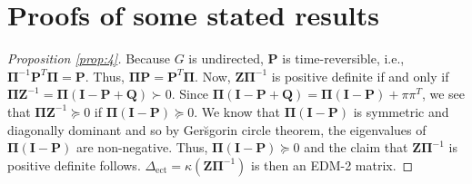 \documentclass[10pt,twocolumn]{article}
\numberwithin{equation}{section}
\begin{document}
\section{Proofs of some stated results}
\begin{proof}[Proposition \ref{prop:4}]
  Because $G$ is undirected, $\mathbf{P}$ is time-reversible, i.e.,
  $\bm{\Pi}^{-1} \mathbf{P}^{T} \bm{\Pi} = \mathbf{P}$. Thus,
  $\bm{\Pi}\mathbf{P} = \mathbf{P}^{T}\bm{\Pi}$. Now,
  $\mathbf{Z}\bm{\Pi}^{-1}$ is positive definite if and only if
  $\bm{\Pi}\mathbf{Z}^{-1} = \bm{\Pi}(\mathbf{I} - \mathbf{P} +
  \mathbf{Q}) \succ 0$. Since $\bm{\Pi}(\mathbf{I} - \mathbf{P} +
  \mathbf{Q}) = \bm{\Pi}(\mathbf{I} - \mathbf{P}) + \pi\pi^{T}$, we
  see that $\bm{\Pi}\mathbf{Z}^{-1} \succeq 0$ if $\bm{\Pi}(\mathbf{I}
  - \mathbf{P}) \succeq 0$. We know that $\bm{\Pi}(\mathbf{I} -
  \mathbf{P})$ is symmetric and diagonally dominant and so by
  Ger\u{s}gorin circle theorem, the eigenvalues of
  $\bm{\Pi}(\mathbf{I} - \mathbf{P})$ are non-negative. Thus,
  $\bm{\Pi}(\mathbf{I} - \mathbf{P}) \succeq 0$ and the claim that
  $\mathbf{Z}\bm{\Pi}^{-1}$ is positive definite
  follows. $\Delta_{\mathrm{ect}} = \kappa(\mathbf{Z}\bm{\Pi}^{-1})$ is then
  an EDM-2 matrix.
\end{proof}
\end{document}
